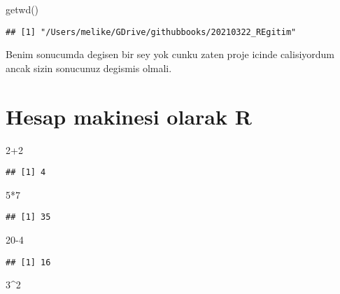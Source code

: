 \documentclass[
]{book}
\newenvironment{Shaded}{\begin{snugshade}}{\end{snugshade}}
\newcommand{\DecValTok}[1]{\textcolor[rgb]{0.00,0.00,0.81}{#1}}
\newcommand{\FunctionTok}[1]{\textcolor[rgb]{0.00,0.00,0.00}{#1}}
\newcommand{\NormalTok}[1]{#1}
\newcommand{\SpecialCharTok}[1]{\textcolor[rgb]{0.00,0.00,0.00}{#1}}
\begin{document}
\begin{Shaded}
\begin{Highlighting}[]
\FunctionTok{getwd}\NormalTok{()}
\end{Highlighting}
\end{Shaded}

\begin{verbatim}
## [1] "/Users/melike/GDrive/githubbooks/20210322_REgitim"
\end{verbatim}

Benim sonucumda degisen bir sey yok cunku zaten proje icinde calisiyordum ancak sizin sonucunuz degismis olmali.

\hypertarget{hesap-makinesi-olarak-r}{%
\section{Hesap makinesi olarak R}\label{hesap-makinesi-olarak-r}}

\begin{Shaded}
\begin{Highlighting}[]
\DecValTok{2}\SpecialCharTok{+}\DecValTok{2}
\end{Highlighting}
\end{Shaded}

\begin{verbatim}
## [1] 4
\end{verbatim}

\begin{Shaded}
\begin{Highlighting}[]
\DecValTok{5}\SpecialCharTok{*}\DecValTok{7}
\end{Highlighting}
\end{Shaded}

\begin{verbatim}
## [1] 35
\end{verbatim}

\begin{Shaded}
\begin{Highlighting}[]
\DecValTok{20{-}4}
\end{Highlighting}
\end{Shaded}

\begin{verbatim}
## [1] 16
\end{verbatim}

\begin{Shaded}
\begin{Highlighting}[]
\DecValTok{3}\SpecialCharTok{\^{}}\DecValTok{2}
\end{Highlighting}
\end{Shaded}
\end{document}
